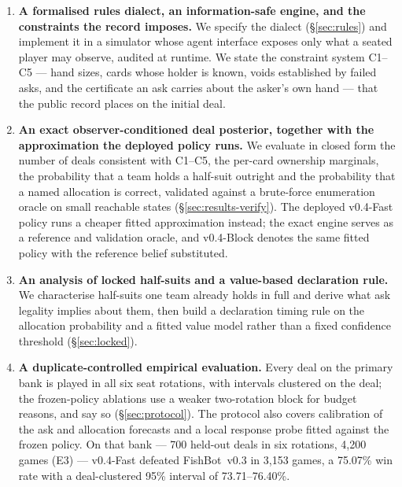 \documentclass[11pt]{article}
\theoremstyle{definition}
\DeclareRobustCommand{\vfast}{\texorpdfstring{\mbox{v0.4-Fast}}{v0.4-Fast}}
\DeclareRobustCommand{\vblock}{\texorpdfstring{\mbox{v0.4-Block}}{v0.4-Block}}
\DeclareRobustCommand{\vthree}{\texorpdfstring{\mbox{FishBot v0.3}}{FishBot v0.3}}
\newcommand{\numHtHGames}{4{,}200}
\newcommand{\numHtHDeals}{700}
\newcommand{\numVsVthree}{75.07}
\newcommand{\numVsVthreeCI}{73.71--76.40}
\newcommand{\numVsVthreeWins}{3{,}153}
\begin{document}
\begin{enumerate}
  \item \textbf{A formalised rules dialect, an information-safe engine, and the
        constraints the record imposes.} We specify the dialect
        (\S\ref{sec:rules}) and implement it in a simulator whose agent interface
        exposes only what a seated player may observe, audited at runtime. We
        state the constraint system C1--C5 --- hand sizes, cards whose holder is
        known, voids established by failed asks, and the certificate an ask
        carries about the asker's own hand --- that the public record places on
        the initial deal.
  \item \textbf{An exact observer-conditioned deal posterior, together with the
        approximation the deployed policy runs.} We evaluate in closed form the
        number of deals consistent with C1--C5, the per-card ownership marginals,
        the probability that a team holds a half-suit outright and the
        probability that a named allocation is correct, validated against a
        brute-force enumeration oracle on small reachable states
        (\S\ref{sec:results-verify}). The deployed \vfast{} policy runs a cheaper
        fitted approximation instead; the exact engine serves as a reference and
        validation oracle, and \vblock{} denotes the same fitted policy with the
        reference belief substituted.
  \item \textbf{An analysis of locked half-suits and a value-based declaration
        rule.} We characterise half-suits one team already holds in full and
        derive what ask legality implies about them, then build a declaration
        timing rule on the allocation probability and a fitted value model rather
        than a fixed confidence threshold (\S\ref{sec:locked}).
  \item \textbf{A duplicate-controlled empirical evaluation.} Every deal on the
        primary bank is played in all six seat rotations, with intervals
        clustered on the deal; the frozen-policy ablations use a weaker
        two-rotation block for budget reasons, and say so (\S\ref{sec:protocol}).
        The protocol also covers calibration of the ask and allocation forecasts
        and a local response probe fitted against the frozen policy. On that bank
        --- \numHtHDeals{} held-out deals in six rotations, \numHtHGames{} games
        (E3) --- \vfast{} defeated \vthree{} in \numVsVthreeWins{} games, a
        \numVsVthree\% win rate with a deal-clustered 95\% interval of
        \numVsVthreeCI\%.
\end{enumerate}
\end{document}
